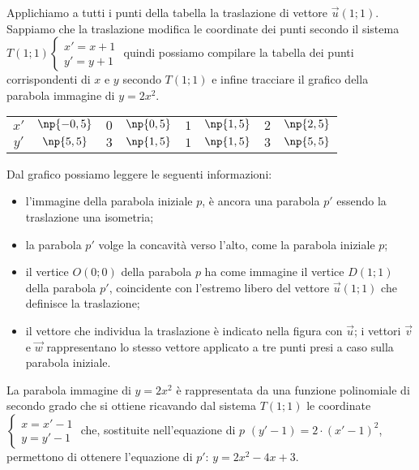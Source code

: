 Applichiamo a tutti i punti della tabella la traslazione di vettore $\vec u(1;1)$. Sappiamo che la traslazione modifica le coordinate dei punti secondo il sistema ${T}(1;1) \left\{\begin{array}{l}{x'=x+1}\\{y'=y+1}\end{array}\right.$ quindi possiamo compilare la tabella dei punti corrispondenti di $x$ e $y$ secondo $T(1;1)$ e infine tracciare il grafico della parabola immagine di $y=2x^2$.

\begin{center}
\begin{tabular} {*{8}{c}}
\toprule
$x'$ & $\np{-0,5}$ & $0$ & $\np{0,5}$ & $1$ & $\np{1,5}$ & $2$ & $\np{2,5}$\\
$y'$ & $\np{5,5}$  & $3$ & $\np{1,5}$ & $1$ & $\np{1,5}$ & $3$ & $\np{5,5}$\\
\bottomrule
\end{tabular}
\end{center}

\begin{center}
 
\end{center}
Dal grafico possiamo leggere le seguenti informazioni:
\begin{itemize}
\item l'immagine della parabola iniziale $p$, è ancora una parabola $p'$ essendo la traslazione una isometria;
\item la parabola $p'$ volge la concavità verso l'alto, come la parabola iniziale $p$;
\item il vertice $O(0;0)$ della parabola $p$ ha come immagine il vertice $D(1;1)$ della parabola $p'$, coincidente con l'estremo libero del vettore $\vec u(1;1)$ che definisce la traslazione;
\item il vettore che individua la traslazione è indicato nella figura con $\vec u$; i vettori $\vec v$ e $\vec w$ rappresentano lo stesso vettore applicato a tre punti presi a caso sulla parabola iniziale.
\end{itemize}
La parabola immagine di $y=2x^2$ è rappresentata da una funzione polinomiale di secondo grado che si ottiene ricavando dal sistema ${T}(1;1)$ le coordinate $\left\{\begin{array}{l}{x=x'-1}\\{y=y'-1}\end{array}\right.$ che, sostituite nell'equazione di $p$ $(y'-1)=2\cdot (x'-1)^2$, permettono di ottenere l'equazione di $p'$: $y=2x^2-4x+3$.

